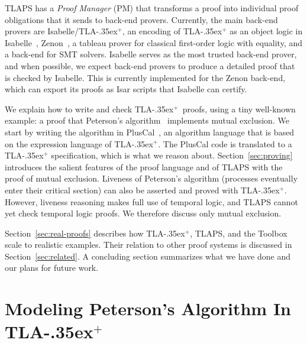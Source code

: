 \documentclass[a4paper]{llncs}
\newcommand{\tlaplus}{\mbox{TLA\kern -.35ex$^+$}\xspace}
\newcommand{\PM}{PM\xspace}
\begin{document}
TLAPS has a \emph{Proof Manager} (\PM) that transforms a proof into
individual proof obligations that it sends to back-end provers.
Currently, the main back-end provers are Isabelle/\tlaplus, an encoding
of \tlaplus as an object logic in Isabelle~\cite{wenzel:isabelle},
Zenon~\cite{bonichon07lpar}, a tableau prover for classical
first-order logic with equality, and a back-end for SMT solvers.
Isabelle serves as
the most trusted back-end prover, and when possible, we expect back-end provers to
produce a detailed proof that is checked by Isabelle. This is currently
implemented for the Zenon back-end, which can export its proofs as Isar
scripts that Isabelle can certify.

We explain how to write and check \tlaplus\ proofs,
using a tiny well-known example: a proof that Peterson's
algorithm~\cite{peterson:myths} implements
mutual exclusion. We start by writing the algorithm in
PlusCal~\cite{lamport:pluscal}, an algorithm language that is based on the
expression language of \tlaplus. The PlusCal code is translated to a \tlaplus
specification, which is what we reason about. Section~\ref{sec:proving}
introduces the salient features of the proof language and of TLAPS with the
proof of mutual exclusion. Liveness of Peterson's
algorithm (processes eventually enter their critical section) can also be
asserted and proved with \tlaplus. However, liveness reasoning makes full use of
temporal logic, and TLAPS cannot yet check temporal logic proofs. We therefore
discuss only mutual exclusion.

Section~\ref{sec:real-proofs} describes how \tlaplus, TLAPS, and the
Toolbox scale to realistic examples.  Their relation to other proof
systems is discussed in Section~\ref{sec:related}.  A concluding
section summarizes what we have done and our plans for future work.



\section{Modeling Peterson's Algorithm In \tlaplus}
\label{sec:peterson}
\end{document}
